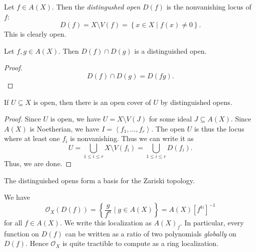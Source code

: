 \begin{definition}\label{dfn:distinguished-open}
	Let $f\in A(X)$. Then the \emph{distingushed open} $D(f)$ is the nonvanishing locus of $f$:
	\[
		D(f) = X\setminus V(f) = \left\{ x\in X\mid f(x) \neq 0 \right\} 
	.\]
	This is clearly open.
\end{definition}

\begin{claim}
	Let $f,g\in A(X)$. Then $D(f) \cap D(g)$ is a distinguished open.
\end{claim}
\begin{proof}
	\[
		D(f) \cap D(g) = D(fg)
	.\]
\end{proof}
\begin{claim}
	If $U\subseteq X$ is open, then there is an open cover of $U$ by distinguished opens.
\end{claim}
\begin{proof}
	Since $U$ is open, we have $U = X \setminus V(J)$ for some ideal $J\subseteq A(X)$. Since $A(X)$ is Noetherian, we have $I = \left\langle f_1, \ldots , f_r \right\rangle $. The open $U$ is thus the locus where at least one $f_i$ is nonvanishing. Thus we can write it as
	\[
		U = \bigcup_{1\leq i\leq r} X \setminus V(f_i) = \bigcup_{1\leq i\leq r} D(f_i)
	.\]
	Thus, we are done.
\end{proof}

\begin{corollary}\label{cor:distinguished-basis}
	The distinguished opens form a basis for the Zariski topology.
\end{corollary}

\begin{proposition}\label{prp:regular-functions-on-distinguished-open}
	We have
	\[
		\mathcal{O}_{X} (D(f)) = \left\{ \frac{g}{f^n} \mid g\in A(X) \right\} =A(X)[f^{\mathbb{N}} ]^{-1} 
	\]
	for all $f\in A(X)$. We write this localization as $A(X)_f$. In particular, every function on $D(f)$ can be written as a ratio of two polynomials \emph{globally} on $D(f)$. Hence $\mathcal{O}_{X} $ is quite tractible to compute as a ring localization.
\end{proposition}


